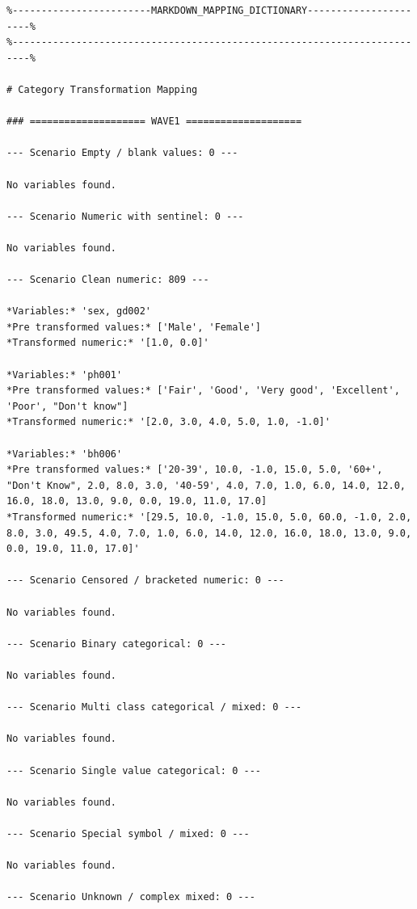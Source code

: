 \clearpage
\begin{mdframed}

\small
\begin{Verbatim}[breaklines=true, breakanywhere=true]
%-------------------------------------------------------------------------%
%------------------------MARKDOWN_MAPPING_DICTIONARY----------------------%
%-------------------------------------------------------------------------%

# Category Transformation Mapping

### ==================== WAVE1 ====================

--- Scenario Empty / blank values: 0 ---

No variables found.

--- Scenario Numeric with sentinel: 0 ---

No variables found.

--- Scenario Clean numeric: 809 ---

*Variables:* 'sex, gd002'  
*Pre transformed values:* ['Male', 'Female']  
*Transformed numeric:* '[1.0, 0.0]'

*Variables:* 'ph001'  
*Pre transformed values:* ['Fair', 'Good', 'Very good', 'Excellent', 'Poor', "Don't know"]  
*Transformed numeric:* '[2.0, 3.0, 4.0, 5.0, 1.0, -1.0]'

*Variables:* 'bh006'  
*Pre transformed values:* ['20-39', 10.0, -1.0, 15.0, 5.0, '60+', "Don't Know", 2.0, 8.0, 3.0, '40-59', 4.0, 7.0, 1.0, 6.0, 14.0, 12.0, 16.0, 18.0, 13.0, 9.0, 0.0, 19.0, 11.0, 17.0]  
*Transformed numeric:* '[29.5, 10.0, -1.0, 15.0, 5.0, 60.0, -1.0, 2.0, 8.0, 3.0, 49.5, 4.0, 7.0, 1.0, 6.0, 14.0, 12.0, 16.0, 18.0, 13.0, 9.0, 0.0, 19.0, 11.0, 17.0]'

--- Scenario Censored / bracketed numeric: 0 ---

No variables found.

--- Scenario Binary categorical: 0 ---

No variables found.

--- Scenario Multi class categorical / mixed: 0 ---

No variables found.

--- Scenario Single value categorical: 0 ---

No variables found.

--- Scenario Special symbol / mixed: 0 ---

No variables found.

--- Scenario Unknown / complex mixed: 0 ---


\end{Verbatim}
\end{mdframed}
